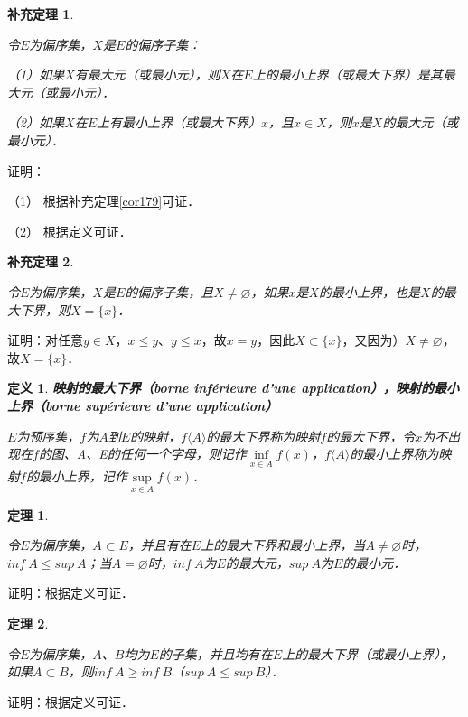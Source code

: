 \documentclass[12pt, a4paper, oneside]{book}
\newtheorem{theo}{定理}
\newtheorem{cor}{补充定理}
\newtheorem{de}{定义}
\begin{document}
			\begin{cor}\label{cor183}
				\hfill\par
				令$E$为偏序集，$X$是$E$的偏序子集：
				\par
				（1）如果$X$有最大元（或最小元），则$X$在$E$上的最小上界（或最大下界）是其最大元（或最小元）．
				\par
				（2）如果$X$在$E$上有最小上界（或最大下界）$x$，且$x\in X$，则$x$是$X$的最大元（或最小元）．
			\end{cor}
			证明：
			\par
			（1）	根据补充定理\ref{cor179}可证．
			\par
			（2）	根据定义可证．

			\begin{cor}\label{cor184}
				\hfill\par
				令$E$为偏序集，$X$是$E$的偏序子集，且$X \neq \varnothing$，如果$x$是$X$的最小上界，也是$X$的最大下界，则$X=\{x\}$．
			\end{cor}
			证明：对任意$y\in X$，$x\leq y$、$y\leq x$，故$x=y$，因此$X\subset \{x\}$，又因为）$X \neq \varnothing$，故$X=\{x\}$．

			\begin{de}
				\textbf{映射的最大下界（borne inférieure d'une application），映射的最小上界（borne supérieure d'une application）}
				\par
				$E$为预序集，$f$为$A$到$E$的映射，$f\langle A \rangle $的最大下界称为映射$f$的最大下界，令$x$为不出现在$f$的图、A、E的任何一个字母，则记作$\mathop{inf}\limits_{x\in A}f(x)$，$f\langle A \rangle $的最小上界称为映射$f$的最小上界，记作$\mathop{sup}\limits_{x\in A}f(x)$．
			\end{de}
			
			\begin{theo}\label{theo60}
				\hfill\par
				令$E$为偏序集，$A\subset E$，并且有在$E$上的最大下界和最小上界，当$A\neq \varnothing$时，$inf\ A\leq sup\ A$；当$A=\varnothing$时，$inf\ A$为$E$的最大元，$sup\ A$为$E$的最小元．
			\end{theo}
			证明：根据定义可证．
						
			\begin{theo}\label{theo61}
				\hfill\par
				令$E$为偏序集，$A$、$B$均为$E$的子集，并且均有在$E$上的最大下界（或最小上界），如果$A\subset B$，则$inf\ A\geq inf\ B$（$sup\ A\leq sup\ B$）．
			\end{theo}
			证明：根据定义可证．
						
\end{document}
